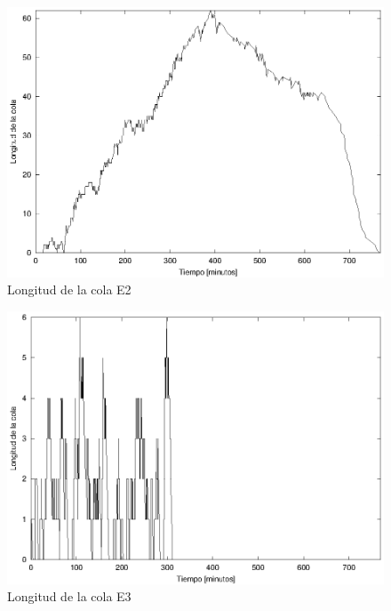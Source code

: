 \documentclass[a4paper,10pt]{article}
\begin{document}
\begin{figure}[hp]
\centering
\includegraphics{graficos/plot_longitud_E2.eps}
\caption{Longitud de la cola E2}
\label{fig:colaE2}
\end{figure}


\begin{figure}[hp]
\centering
\includegraphics{graficos/plot_longitud_E3.eps}
\caption{Longitud de la cola E3}
\label{fig:colaE3}
\end{figure}
\end{document}
